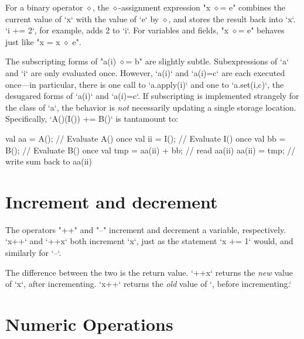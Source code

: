 For a binary operator $\diamond$, the $\diamond$-assignment expression
\xcdmath"x $\diamond$= e" combines the current value of \xcd`x` with the value
of \xcd`e` by {$\diamond$}, and stores the result back into \xcd`x`.  
\xcd`i += 2`, for example, adds 2 to \xcd`i`. For variables and fields, 
\xcdmath"x $\diamond$= e" behaves just like \xcdmath"x = x $\diamond$ e". 

The subscripting forms of \xcdmath"a(i) $\diamond$= b" are slightly subtle.
Subexpressions of \xcd`a` and \xcd`i` are only evaluated once.  However,
\xcd`a(i)` and \xcd`a(i)=c` are each executed once---in particular, there is
one call to \xcd`a.apply(i)` and one to \xcd`a.set(i,c)`, the desugared forms
of \xcd`a(i)` and \xcd`a(i)=c`.  If subscripting is implemented strangely for
the class of \xcd`a`, the behavior is {\em not} necessarily updating a single
storage location. Specifically, \xcd`A()(I()) += B()` is tantamount to: 
\begin{xten}
{
  val aa = A();  // Evaluate A() once
  val ii = I();  // Evaluate I() once
  val bb = B();  // Evaluate B() once
  val tmp = aa(ii) + bb; // read aa(ii)
  aa(ii) = tmp;  // write sum back to aa(ii)
}
\end{xten}





\section{Increment and decrement}


The operators \xcd"++" and \xcd"--" increment and decrement
a variable, respectively.  
\xcd`x++` and \xcd`++x` both increment \xcd`x`, just as the statement 
\xcd`x += 1` would, and similarly for \xcd`--`.  

The difference between the two is the return value.  
\xcd`++x` returns the {\em new} value of \xcd`x`, after incrementing.
\xcd`x++` returns the {\em old} value of \xcd`, before incrementing.`


\section{Numeric Operations}
\label{XtenPromotions}

